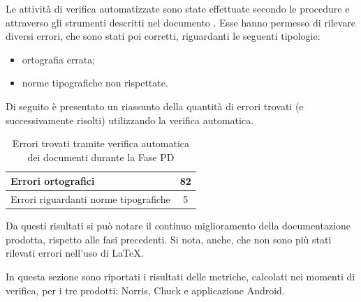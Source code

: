 			Le attività di verifica automatizzate sono state effettuate secondo le procedure e attraverso gli strumenti descritti nel documento . Esse hanno permesso di rilevare diversi errori, che sono stati poi corretti, riguardanti le seguenti tipologie:
			\begin{itemize}
				\item ortografia errata;
				\item norme tipografiche non rispettate.
			\end{itemize}
			Di seguito è presentato un riassunto della quantità di errori trovati (e successivamente risolti) utilizzando la verifica automatica.	
			\begin{table}[H]
				\centering
					\begin{tabu}{| l | c |}
						\hline
						Errori ortografici	& 82	\\ \hline
						Errori riguardanti norme tipografiche	& 5	\\ \hline
					\end{tabu}
				\caption{Errori trovati tramite verifica automatica dei documenti durante la Fase PD}
			\end{table}
			Da questi risultati si può notare il continuo miglioramento della documentazione prodotta, rispetto alle fasi precedenti. Si nota, anche, che non sono più stati rilevati errori nell'uso di \LaTeX{}.

		In questa sezione sono riportati i risultati delle metriche, calcolati nei momenti di verifica, per i tre prodotti: Norris, Chuck e applicazione Android.

